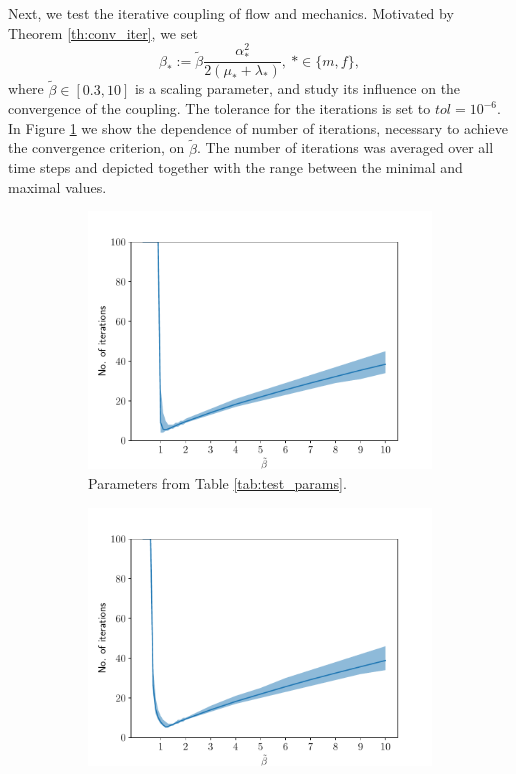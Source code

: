 \documentclass[a4paper]{article}
\numberwithin{equation}{section}
\newcommand{\eq}[1]{\begin{equation}#1\end{equation}}
\begin{document}
Next, we test the iterative coupling of flow and mechanics.
Motivated by Theorem \ref{th:conv_iter}, we set
\eq{ \beta_*:=\tilde\beta\frac{\alpha_*^2}{2(\mu_*+\lambda_*)}, ~*\in\{m,f\}, }
where $\tilde\beta\in[0.3,10]$ is a scaling parameter, and study its influence on the convergence of the coupling.
The tolerance for the iterations is set to $tol=10^{-6}$.
In Figure \ref{fig:test_iterations_table} we show the dependence of number of iterations, necessary to achieve the convergence criterion, on $\tilde\beta$.
The number of iterations was averaged over all time steps and depicted together with the range between the minimal and maximal values.
\begin{figure}
\centering
\begin{subfigure}[b]{0.49\textwidth}
\centering
\includegraphics[width=\textwidth]{figures/conv_result_linear.yaml_dt_100_alpha_1_cond_9.81e-18_Er_6e+10_Ef_1e+06_nur_0_nuf_0.pdf}
\caption{Parameters from Table \ref{tab:test_params}.}
\label{fig:test_iterations_table}
\end{subfigure}
\begin{subfigure}[b]{0.49\textwidth}
\centering
\includegraphics[width=\textwidth]{figures/conv_result_linear.yaml_dt_100_alpha_1_cond_9.81e-11_Er_6e+10_Ef_1e+06_nur_0_nuf_0.pdf}

\end{subfigure}
\end{figure}
\end{document}
